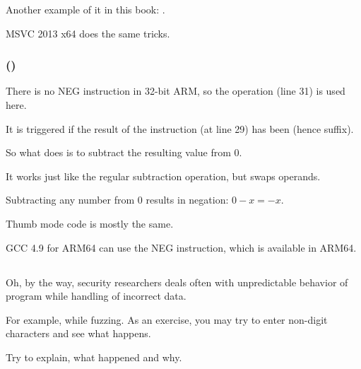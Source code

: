 Another example of it in this book: 
.

\Optimizing MSVC 2013 x64 does the same tricks.

\subsubsection{\OptimizingKeilVI (\ARMMode)}



There is no NEG instruction in 32-bit ARM, so the  operation (line 31) 
is used here.

It is triggered if the result of the  instruction (at line 29) has been  (hence  suffix).

So what  does is to subtract the resulting value from 0.

It works just like the regular subtraction operation, but swaps operands.

Subtracting any number from 0 results in negation: $0-x=-x$.

Thumb mode code is mostly the same.

GCC 4.9 for ARM64 can use the NEG instruction, which is available in ARM64.

\subsection{\Exercise{}}

Oh, by the way, security researchers deals often with unpredictable behavior of program while handling of incorrect data.

For example, while fuzzing.
As an exercise, you may try to enter non-digit characters and see what happens.

Try to explain, what happened and why.



